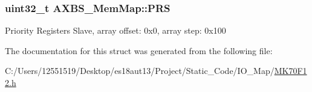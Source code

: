 \subsubsection[{P\+R\+S}]{\setlength{\rightskip}{0pt plus 5cm}uint32\+\_\+t A\+X\+B\+S\+\_\+\+Mem\+Map\+::\+P\+R\+S}\label{struct_a_x_b_s___mem_map_a840c4c5791c39bad3cfa7140aaab0a1f}
Priority Registers Slave, array offset\+: 0x0, array step\+: 0x100 

The documentation for this struct was generated from the following file\+:\begin{DoxyCompactItemize}
\item 
C\+:/\+Users/12551519/\+Desktop/es18aut13/\+Project/\+Static\+\_\+\+Code/\+I\+O\+\_\+\+Map/\hyperlink{_m_k70_f12_8h}{M\+K70\+F12.\+h}\end{DoxyCompactItemize}
